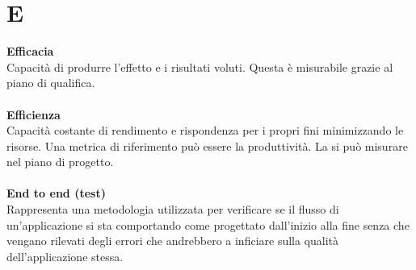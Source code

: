 \section{E}
\textbf{Efficacia}\\
Capacità di produrre l'effetto e i risultati voluti. Questa è misurabile grazie al piano di qualifica. \\ \\
\textbf{Efficienza}\\
Capacità costante di rendimento e rispondenza per i propri fini minimizzando le risorse. Una metrica di riferimento può essere la  produttività. La si può misurare nel piano di progetto. \\ \\
\textbf{End to end (test)}\\
Rappresenta una metodologia utilizzata per verificare se il flusso di un'applicazione si sta comportando come progettato dall'inizio alla fine senza che vengano rilevati degli errori che andrebbero a inficiare sulla qualità dell’applicazione stessa. \\ \\
\clearpage
